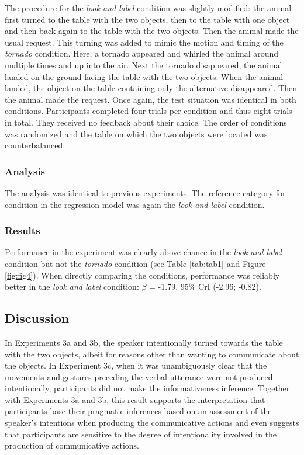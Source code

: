 \documentclass[
  man,floatsintext]{apa6}
\begin{document}
The procedure for the \emph{look and label} condition was slightly modified: the animal first turned to the table with the two objects, then to the table with one object and then back again to the table with the two objects. Then the animal made the usual request. This turning was added to mimic the motion and timing of the \emph{tornado} condition. Here, a tornado appeared and whirled the animal around multiple times and up into the air. Next the tornado disappeared, the animal landed on the ground facing the table with the two objects. When the animal landed, the object on the table containing only the alternative disappeared. Then the animal made the request. Once again, the test situation was identical in both conditions. Participants completed four trials per condition and thus eight trials in total. They received no feedback about their choice. The order of conditions was randomized and the table on which the two objects were located was counterbalanced.

\subsubsection{Analysis}\label{analysis-5}

The analysis was identical to previous experiments. The reference category for condition in the regression model was again the \emph{look and label} condition.

\subsubsection{Results}\label{results-5}

Performance in the experiment was clearly above chance in the \emph{look and label} condition but not the \emph{tornado} condition (see Table \ref{tab:tab1} and Figure \ref{fig:fig4}). When directly comparing the conditions, performance was reliably better in the \emph{look and label} condition: \(\beta\) = -1.79, 95\% CrI (-2.96; -0.82).

\subsection{Discussion}\label{discussion-5}

In Experiments 3a and 3b, the speaker intentionally turned towards the table with the two objects, albeit for reasons other than wanting to communicate about the objects. In Experiment 3c, when it was unambiguously clear that the movements and gestures preceding the verbal utterance were not produced intentionally, participants did not make the informativeness inference. Together with Experiments 3a and 3b, this result supports the interpretation that participants base their pragmatic inferences based on an assessment of the speaker's intentions when producing the communicative actions and even suggests that participants are sensitive to the degree of intentionality involved in the production of communicative actions.
\end{document}

